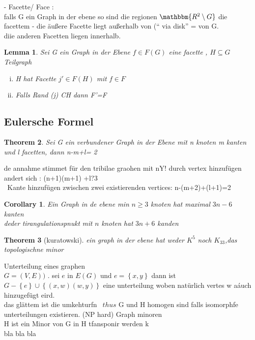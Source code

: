 \documentclass[a4paper]{article}
\newtheorem{theorem}{Theorem}[section]
\newtheorem{lemma}[theorem]{Lemma}
\newtheorem{corollary}{Corollary}
\theoremstyle{definition}
\theoremstyle{remark}
\begin{document}
- Facette/ Face :\\
falls G ein Graph in der ebene so sind die regionen $\mathbbm{R^2 \setminus G}$ die facettem 
- die äußere Facette liegt außerhalb von (`` via disk'' = von G.\\
  diie anderen Facetten liegen innerhalb.\\
\begin{lemma}
  Sei G ein Graph in der Ebene $f \in F(G)$ eine facette , $H\subseteq G$ Teilgraph 
  \begin{enumerate}[(i)]
    \item H hat Facette  $j'\in F(H)$ mit  $f\in F$
     \item Falls Rand (j) CH dann F'=F
  \end{enumerate} 	
\end{lemma}

\subsection{Eulersche Formel}
\label{sub:eulersche_formel}

\begin{theorem}
  Sei G ein verbundener Graph in der Ebene mit n knoten m kanten und l facetten, dann n-m+l= 2
\end{theorem}
de annahme stimmet für den tribilae graohen mit nY!
durch vertex hinzufügen andert sich : (n+1)(m+1) +l?3
\\\
Kante hinzufügen zwischen zwei existierenden vertices:
n-(m+2)+(l+1)=2
\begin{corollary}
  Ein Graph in de ebene min $n\geq 3$ knoten hat maximal $3n-6$ kanten\\
  deder tirangulationspnukt mit $n$ knoten hat $3n+6$ kanden\\

\end{corollary}
\begin{theorem}
  [kuratowski]
  ein graph in der ebene hat weder $K^5$ noch $K_{33}$,das topologischne minor
\end{theorem}

Unterteilung eines graphen \\
$G=(V,E))$
. sei $e$ in $E(G)$ und $e=\left\{ x,y \right\}$
dann ist $ G-\left\{ e \right\}\cup \left\{ (x,w)(w,y) \right\}$ eine unterteilung woben natürlich vertes w aáuch hinzugefügt eird.\\
das glättem  ist die umkehturfn \
$thus$ G und H homogen sind falls isomorphfe unterteilungen existieren. (NP hard)
Graph minoren \\
H ist ein Minor von G in H tfansponir werden k\\
bla bla bla\\
\end{document}
